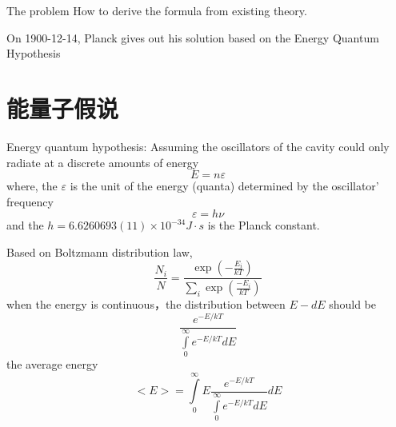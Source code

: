 \begin{frame}
    \begin{tcolorbox2}{The problem}
        How to derive the formula from existing theory.
    \end{tcolorbox2}
    \begin{tcolorbox}[colback=yellow!10,colframe=red!75!black,title=Solution]
        On 1900-12-14, Planck gives out his solution based on the Energy Quantum Hypothesis  
    \end{tcolorbox}
\end{frame}

\section{能量子假说}
\begin{frame}
    \begin{tcolorbox1}{Energy quantum hypothesis:}
    Assuming the oscillators of the cavity could only radiate at a discrete amounts of energy
    \begin{equation}
        E=n\varepsilon
    \end{equation}
    where, the $\varepsilon$ is the unit of the energy (quanta) determined by the oscillator' frequency 
    \begin{equation}
        \varepsilon=h\nu
    \end{equation}
    and the $h=6.6260693(11)×10^{-34} J\cdot s $ is the Planck constant. 
    \end{tcolorbox1}
\end{frame}

\begin{frame}
    Based on Boltzmann distribution law,
    \begin{equation*}
        \frac{N_{i}}{N}=\frac{\exp \left(-\frac{E_{i}}{k T}\right)}{\sum_{i} \exp \left(\frac{-E_{i}}{k T}\right)}
    \end{equation*}
    \bullet when the energy is continuous，the distribution between $E - dE$ should be 
    \begin{equation*}
        \frac{e^{-E / k T}}{\int\limits_{0}^{\infty} e^{-E / k T} d E}
    \end{equation*}  
    the average energy 
    \begin{equation*}
        <E>=\int\limits_{0}^{\infty} E \frac{e^{-E / k T}}{\int\limits_{0}^{\infty} e^{-E / k T} d E} d E
    \end{equation*}
\end{frame}

